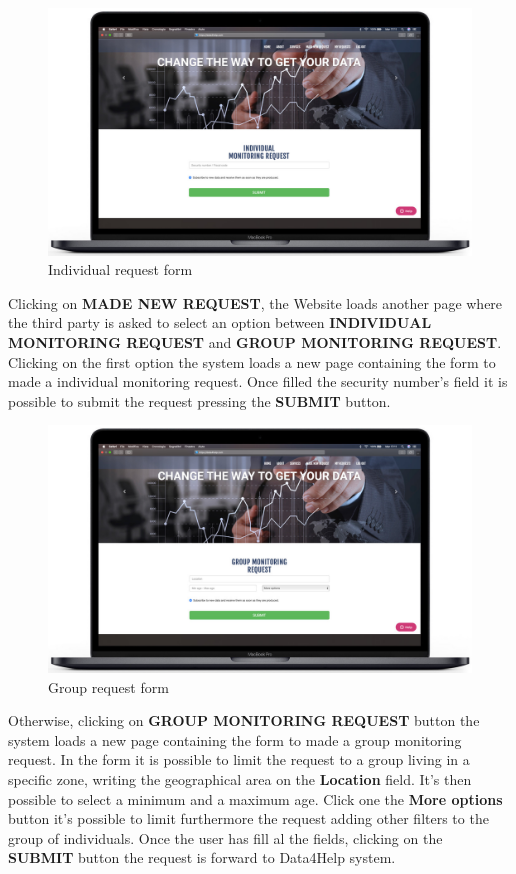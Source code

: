 \begin{enumerate}
\begin{figure}[H]
        \centering
          \includegraphics[scale = 0.33]{Images/Mockups/IndividualRequest.jpg}
          	\caption{Individual request form}
\end{figure}
Clicking on \textbf{MADE NEW REQUEST}, the Website loads another page where the third party is asked to select an option between \textbf{INDIVIDUAL MONITORING REQUEST} and \textbf{GROUP MONITORING REQUEST}. Clicking on the first option the system loads a new page containing the form to made a individual monitoring request. Once filled the security number's field it is possible to submit the request pressing the \textbf{SUBMIT} button.
\clearpage

\begin{figure}[H]
        \centering
          \includegraphics[scale = 0.33]{Images/Mockups/GroupRequest.jpg}
          	\caption{Group request form}
\end{figure}
Otherwise, clicking on \textbf{GROUP MONITORING REQUEST} button the system loads a new page containing the form to made a group monitoring request. In the form it is possible to limit the request to a group living in a specific zone, writing the geographical area on the \textbf{Location} field. It's then possible to select a minimum and a maximum age. Click one the \textbf{More options} button it's possible to limit furthermore the request adding other filters to the group of individuals. Once the user has fill al the fields, clicking on the \textbf{SUBMIT} button the request is forward to Data4Help system.
\clearpage


\end{enumerate}
